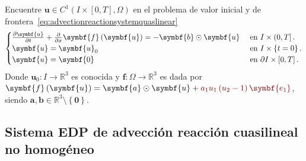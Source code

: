 Encuentre
\begin{math}
	\symbf{u}\in
	C^{1}\left(I\times\left[0,T\right],\Omega\right)
\end{math}
en el problema de valor inicial y de frontera~\eqref{eq:advectionreactionsystemquaslinear}
\begin{equation}\label{eq:advectionreactionsystemquaslinear}
	\begin{cases}
		\diffp{\symbf{u}}{t}+\diffp{}{x}\symbf{f}\left(\symbf{u}\right)=
		-\symbf{b}\odot\symbf{u} & \text{ en }I\times\left(0,T\right].          \\
		\symbf{u}                                                      =
		\symbf{u}_{0}            & \text{ en }I\times\left\{t=0\right\}.        \\
		\symbf{u}                                                      =
		\symbf{0}                & \text{ en }\partial I\times\left[0,T\right].
	\end{cases}
\end{equation}
Donde
\begin{math}
	\symbf{u}_{0}\colon I\to
	\mathbb{R}^{3}
\end{math}
es conocida y
\begin{math}
	\symbf{f}\colon\Omega\to
	\mathbb{R}^{3}
\end{math}
es dada por
\begin{math}
	\symbf{f}\left(\symbf{u}\right)=
	\symbf{a}\odot\symbf{u}+
	\mathcolor{DarkRed}{a_{1}u_{1}\left(u_{2}-1\right)\symbf{e_{1}}}
\end{math},
siendo $\symbf{a},\symbf{b}\in\mathbb{R}^{3}\setminus\left\{\symbf{0}\right\}$.

\subsection*{Sistema EDP de advección reacción cuasilineal no homogéneo}

